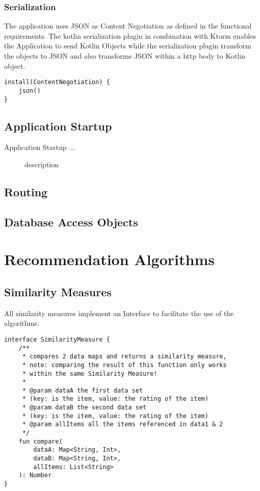 \subsubsection{Serialization}

The application uses JSON as Content Negotiation as defined in the functional requirements. The kotlin serialization plugin in combination with Ktorm enables the Application to send Kotlin Objects while the serialization plugin transform the objects to JSON and also transforms JSON within a http body to Kotlin object. 

\begin{verbatim}
install(ContentNegotiation) {
    json()
}
\end{verbatim}


\subsection{Application Startup}

Application Startup ...

\newpage

\begin{figure}[h]
\centering

\caption{\label{fig:startup}description}
\end{figure}

\subsection{Routing}

\subsection{Database Access Objects}

\section{Recommendation Algorithms}

\subsection{Similarity Measures}

All similarity measures implement an Interface to facilitate the use of the algorithms.

\begin{verbatim}
interface SimilarityMeasure {
    /**
     * compares 2 data maps and returns a similarity measure,
     * note: comparing the result of this function only works 
     * within the same Similarity Measure!
     *
     * @param dataA the first data set
     * (key: is the item, value: the rating of the item)
     * @param dataB the second data set
     * (key: is the item, value: the rating of the item)
     * @param allItems all the items referenced in data1 & 2
     */
    fun compare(
        dataA: Map<String, Int>,
        dataB: Map<String, Int>,
        allItems: List<String>
    ): Number
}
\end{verbatim}


